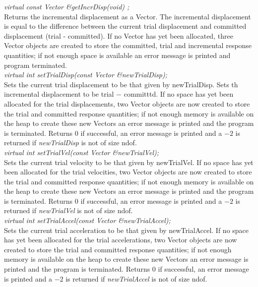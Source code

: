{\em  virtual const Vector \&getIncrDisp(void) ;}  \\
Returns the incremental displacement as a Vector. The incremental displacement is 
equal to the difference between the current trial displacement and committed
displacement (trial - committed).
If no Vector has yet been allocated, three Vector 
objects are created to store the committed, trial and incremental response
quantities; if not enough space is available an error message
is printed and program terminated. \\ 


{\em virtual int setTrialDisp(const Vector \&newTrialDisp);} \\
Sets the current trial displacement to be that given by
\p newTrialDisp. Sets th incremental displacement to be trial $-$ committtd.
If no space has yet been allocated for
the trial displacements, two Vector objects are now created to store
the trial and committed response quantities; if not enough memory 
is available on the heap to create these new Vectors an error message
is printed and the program is terminated. Returns $0$ if successful,
an error message is printed and a $-2$ is returned if {\em
newTrialDisp} is not of size \p ndof. \\


{\em virtual int setTrialVel(const Vector \&newTrialVel);} \\
Sets the current trial velocity to be that given by
\p newTrialVel. If no space has yet been allocated for
the trial velocities, two Vector objects are now created to store
the trial and committed response quantities; if not enough memory 
is available on the heap to create these new Vectors an error message
is printed and the program is terminated. Returns $0$ if successful,
an error message is printed and a $-2$ is returned if {\em
newTrialVel} is not of size \p ndof. \\

{\em virtual int setTrialAccel(const Vector \&newTrialAccel);} \\
Sets the current trial acceleration to be that given by
\p newTrialAccel. If no space has yet been allocated for
the trial accelerations, two Vector objects are now created to store
the trial and committed response quantities; if not enough memory 
is available on the heap to create these new Vectors an error message
is printed and the program is terminated. Returns $0$ if successful,
an error message is printed and a $-2$ is returned if {\em
newTrialAccel} is not of size \p ndof. \\

